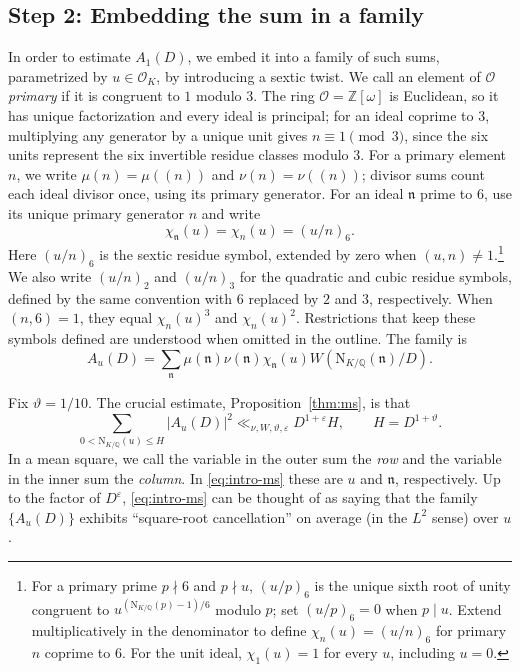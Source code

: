 \documentclass[11pt,a4paper]{article}
\numberwithin{equation}{section}
\numberwithin{figure}{section}
\theoremstyle{definition}
\theoremstyle{remark}
\newcommand{\Q}{\mathbb Q}
\newcommand{\NK}{\mathrm N_{K/\Q}}
\newcommand{\OO}{\mathcal O}
\begin{document}
\subsection{Step 2: Embedding the sum in a family}

In order to estimate $A_1(D)$, we embed it into a family of such sums,
parametrized by $u\in\OO_K$, by introducing a sextic twist.
We call an element of $\OO$ \emph{primary} if it is congruent to $1$
modulo $3$. The ring $\OO=\mathbb Z[\omega]$ is Euclidean, so it has unique
factorization and every ideal is principal; for an ideal coprime to $3$,
multiplying any generator by a unique unit gives $n\equiv1\pmod3$,
since the six units represent the six invertible residue classes modulo $3$.
For a primary element $n$, we write $\mu(n)=\mu((n))$ and $\nu(n)=\nu((n))$;
divisor sums count each ideal divisor once, using its primary generator.
For an ideal $\mathfrak n$ prime to $6$, use its unique primary generator
$n$ and write
\[
 \chi_{\mathfrak n}(u)=\chi_n(u)=(u/n)_6.
\]
Here $(u/n)_6$ is the sextic residue symbol, extended by zero
when $(u,n)\neq 1$.\footnote{For a primary prime $p\nmid6$ and $p\nmid u$,
$(u/p)_6$ is the unique sixth root of unity congruent to
$u^{(\NK(p)-1)/6}$ modulo $p$; set $(u/p)_6=0$ when $p\mid u$.
Extend multiplicatively in the denominator to define
$\chi_n(u)=(u/n)_6$ for primary $n$ coprime to $6$.
For the unit ideal, $\chi_1(u)=1$ for every $u$, including $u=0$.
}
We also write $(u/n)_2$ and $(u/n)_3$ for the quadratic and cubic residue symbols, defined by the same convention with $6$ replaced by $2$ and $3$, respectively. When $(n,6)=1$, they equal $\chi_n(u)^3$ and $\chi_n(u)^2$. Restrictions that keep these symbols defined are understood when omitted in the outline.
The family is
\begin{equation}\label{eq:intro-family}
 A_u(D)=\sum_{\mathfrak n}
   \mu(\mathfrak n)\nu(\mathfrak n)\chi_{\mathfrak n}(u)
   W(\NK(\mathfrak n)/D).
\end{equation}

Fix $\vartheta=1/10$. The crucial estimate, Proposition~\ref{thm:ms}, is that
\begin{equation}\label{eq:intro-ms}
 \sum_{0<\NK(u)\le H}|A_u(D)|^2
       \ll_{\nu,W,\vartheta,\varepsilon}D^{1+\varepsilon}H,
 \qquad H=D^{1+\vartheta}.
\end{equation}
In a mean square, we call the variable in the outer sum the \emph{row}
and the variable in the inner sum the \emph{column}. In
\eqref{eq:intro-ms} these are $u$ and $\mathfrak n$, respectively.
Up to the factor of $D^\varepsilon$, \eqref{eq:intro-ms} can be thought of as saying that the family $\{A_u(D)\}$ exhibits ``square-root cancellation'' on average (in the $L^2$ sense) over $u$.
\end{document}
